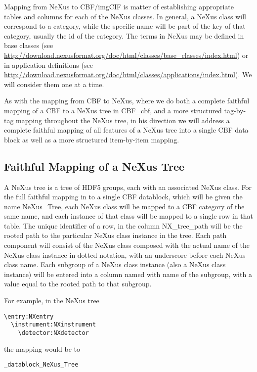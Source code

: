 \documentclass[11pt]{article}
\begin{document}
{{Mapping from NeXus to CBF/imgCIF is matter of establishing appropriate
tables and columns for each of the NeXus classes.  In general, a NeXus
class will correspond to a category, while the specific name will
be part of the key of that category, usually the id of the category.
The terms in NeXus may be defined in base classes (see
\url{http://download.nexusformat.org/doc/html/classes/base_classes/index.html})
or in application definitions (see
\url{http://download.nexusformat.org/doc/html/classes/applications/index.html}).
We will consider them one at a time.

As with the mapping from CBF to NeXus, where we do both a complete faithful
mapping of a CBF to a NeXus tree in CBF\_cbf, and a more structured tag-by-tag
mapping throughout the NeXus tree, in his direction we will address a complete
faithful mapping of all features of a NeXus tree into a single CBF data block
as well as a more structured item-by-item mapping.

\subsection{Faithful Mapping of a NeXus Tree}

A NeXus tree is a tree of HDF5 groups, each with an associated NeXus class.
For the full faithful mapping in to a single CBF datablock, which will
be given the name NeXus\_Tree, each NeXus class will be mapped to a
CBF category of the same name, and each instance of that class will
be mapped to a single row in that table.  The unique identifier of
a row, in the column NX\_tree\_path will be the rooted path to the 
particular NeXus class instance in the tree.  Each path component
will consist of the NeXus class composed with the actual name of the NeXus class instance in
dotted notation, with an underscore before each NeXus class name.
Each subgroup of a NeXus class instance (also a NeXus class instance) will be entered into a column 
named with name of the subgroup, with a value equal to the rooted
path to that subgroup.

For example, in the NeXus tree

\begin{verbatim}
\entry:NXentry
  \instrument:NXinstrument
    \detector:NXdetector
\end{verbatim}

the mapping would be to

\begin{verbatim}
_datablock_NeXus_Tree


\end{verbatim}}}
\end{document}
